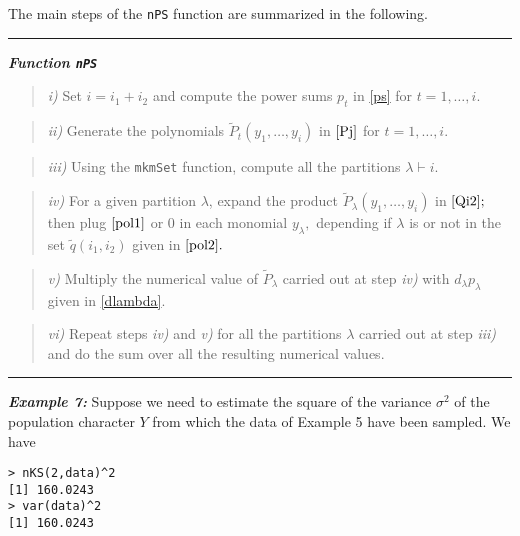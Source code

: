 \hskip-0.5cm The main steps of the \texttt{nPS} function are summarized in the following.

\noindent

\rule{13cm}{0.4pt}

\textbf{\emph{Function \texttt{nPS}}}

\begin{quote}
\emph{i)} Set \(i=i_1+i_2\) and compute the power sums \(p_t\) in \eqref{ps} for \(t=1, \ldots,i.\)
\end{quote}

\begin{quote}
\emph{ii)} Generate the polynomials \(\tilde{P}_{t}(y_1, \ldots, y_i)\) in \(\eqref{Pj}\) for \(t=1, \ldots, i.\)
\end{quote}

\begin{quote}
\emph{iii)} Using the \texttt{mkmSet} function, compute all the partitions \(\lambda \vdash i.\)
\end{quote}

\begin{quote}
\emph{iv)} For a given partition \(\lambda\), expand the product \(\tilde{P}_{\lambda}(y_1, \ldots, y_i)\) in \(\eqref{Qi2};\) then plug \(\eqref{pol1}\) or \(0\) in each monomial \(y_{\lambda},\) depending if \(\lambda\) is or not in the set \(\tilde{q}(i_1,i_2)\) given in \(\eqref{pol2}.\)
\end{quote}

\begin{quote}
\emph{v)} Multiply the numerical value of \(\tilde{P}_{\lambda}\) carried out at step \emph{iv)} with \(d_{\lambda} p_{\lambda}\) given in \eqref{dlambda}.
\end{quote}

\begin{quote}
\emph{vi)} Repeat steps \emph{iv)} and \emph{v)} for all the partitions \(\lambda\) carried out at step \emph{iii)} and do the sum over all the resulting numerical values.
\end{quote}

\noindent

\rule{13cm}{0.4pt}

\hskip-0.5cm\textbf{\emph{Example 7:}} Suppose we need to estimate the square of the variance \(\sigma^2\) of the population character \(Y\) from which the data of Example 5 have been sampled. We have

\begin{verbatim}
> nKS(2,data)^2
[1] 160.0243
> var(data)^2
[1] 160.0243
\end{verbatim}

